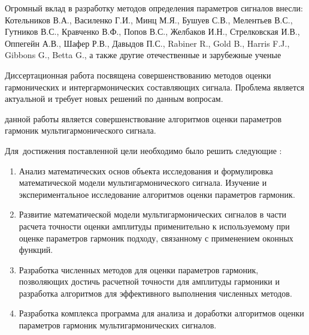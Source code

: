 Огромный вклад в разработку методов определения параметров
сигналов внесли: Котельников В.А., Василенко Г.И., Минц М.Я., Бушуев
С.В., Мелентьев В.С., Гутников В.С., Кравченко В.Ф., Попов В.С., Желбаков
И.Н., Стрелковская И.В., Оппегейн А.В., Шафер Р.В., Давыдов П.С., Rabiner
R., Gold B., Harris F.J., Gibbons G., Betta G., а также другие отечественные и
зарубежные ученые




Диссертационная работа посвящена совершенствованию методов оценки гармонических и интергармонических составляющих сигнала. Проблема является актуальной и требует новых решений по данным вопросам.

{\aim} данной работы является совершенствование алгоритмов оценки параметров гармоник мультигармонического сигнала.



Для~достижения поставленной цели необходимо было решить следующие {\tasks}:
\begin{enumerate}
  \item Анализ математических основ объекта исследования и формулировка математической модели мультигармонического сигнала. Изучение и экспериментальное исследование алгоритмов оценки параметров гармоник.
  
  \item Развитие математической модели мультигармонических сигналов в части расчета точности оценки амплитуды применительно к используемому при оценке параметров гармоник подходу, связанному с применением оконных функций.
  
  \item Разработка численных методов для оценки параметров гармоник, позволяющих достичь расчетной точности для амплитуды гармоники и разработка алгоритмов для эффективного выполнения численных методов.
  
  \item Разработка комплекса программа для анализа и доработки алгоритмов оценки параметров гармоник мультигармонических сигналов.
\end{enumerate}


